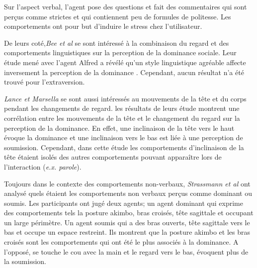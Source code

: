 		Sur l'aspect verbal, l'agent pose des questions et fait des commentaires qui sont perçus comme strictes et qui contiennent peu de formules de politesse. 
		 Les comportements ont pour but d'induire le stress chez l'utilisateur. 
		
		De leurs coté,\emph{Bee et al} \cite{bee2010bossy} se sont intéressé à la combinaison du regard et des comportements linguistiques sur la perception de la dominance sociale.  Leur étude mené avec l'agent Alfred a révélé qu'un style linguistique agréable affecte inversement la perception de la dominance \cite{bee2010bossy}. Cependant, aucun résultat n'a été trouvé pour l'extraversion. 
		
		 \emph{Lance et Marsella} \cite{lance2008relation,lance2007emotionally} se sont aussi intéressés au mouvements de la tête et du corps pendant les changements de regard. les résultats de leurs étude montrent une corrélation entre les mouvements de la tête et le changement du regard sur la perception de la dominance. En effet, une inclinaison de la tête vers le haut évoque la dominance et une inclinaison vers le bas est liée à une perception de soumission. Cependant, dans cette étude les comportements d'inclinaison de la tête étaient isolés des autres comportements pouvant apparaître lors de l'interaction (\emph{e.x. parole}).
		
		Toujours dans le contexte des comportements non-verbaux, \emph{Strassmann et al} \cite{strassmann2016effect} ont analysé quels étaient les comportements non verbaux perçus comme dominant ou soumis. 
		Les participants ont jugé deux agents;  un agent dominant qui exprime des comportements tels la posture akimbo, bras croisés, tête sagittale et occupant un large périmètre. Un agent soumis qui a des bras ouverts, tête sagittale vers le bas et occupe un espace restreint.
		Ils montrent que la posture akimbo et les bras croisés sont les comportements qui ont été le plus associés à la dominance. A l'opposé, se touche le cou avec la main et le regard vers le bas, évoquent plus de la soumission. 
		
